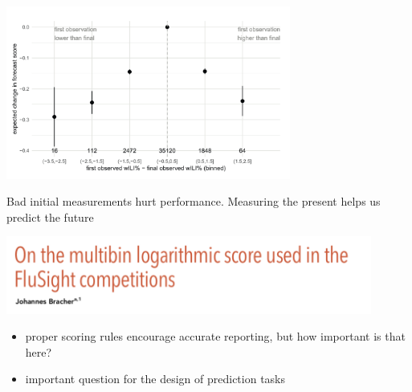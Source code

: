 \documentclass[aspectratio=169]{beamer}
\begin{document}
\begin{frame}

\begin{center}
\includegraphics[width = 0.7\textwidth]{figures/reich_collaborative_2019_fig6}
\end{center}

Bad initial measurements hurt performance. Measuring the present helps us predict the future

\end{frame}
\begin{frame}

\begin{center}
\includegraphics[width = 0.9\textwidth]{figures/bracher_on_2019_title}
\end{center}

\begin{itemize}
\item proper scoring rules encourage accurate reporting, but how important is that here?
\pause
\item important question for the design of prediction tasks
\end{itemize}

\end{frame}
\end{document}

